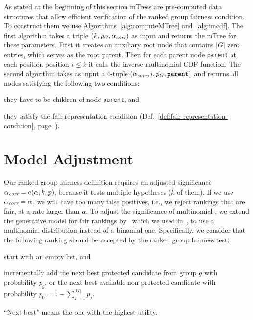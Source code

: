 

As stated at the beginning of this section mTrees are pre-computed data structures that allow efficient verification of the ranked group fairness condition.
%
To construct them we use Algorithms~\ref{alg:computeMTree} and~\ref{alg:imcdf}.
%
The first algorithm \algoComputeMTree takes a triple $(k,p_G,\alpha_\textit{corr})$ as input and returns the mTree for these parameters.
%
First it creates an auxiliary root node that contains $|G|$ zero entries, which serves as the root parent.
%
Then for each parent node \texttt{parent} at each position position $i \leq k$ it calls the inverse multinomial CDF function.
%
The second algorithm \algoImcdf takes as input a 4-tuple $(\alpha_\textit{corr}, i, p_G, \texttt{parent})$ and returns all nodes satisfying the following two conditions:
\begin{inparaenum}[(i.)]
	\item they have to be children of node \texttt{parent}, and
	\item they satisfy the fair representation condition (Def.~\ref{def:fair-representation-condition}, page~\pageref{def:fair-representation-condition}).
\end{inparaenum}

\section{Model Adjustment}
\label{sec:model-adjustment}

Our ranked group fairness definition requires an adjusted significance $\alpha_\textit{corr} = \operatorname{c}(\alpha, k, p)$, because it tests multiple hypotheses ($k$ of them).
%
If we use $\alpha_\textit{corr} = \alpha$, we will have too many false positives, i.e., we reject rankings that are fair, at a rate larger than $\alpha$.
%
To adjust the significance of multinomial \algoFAIR, we extend the generative model for fair rankings by~\citet{yang2016measuring} which we used in~\cite{zehlike2017fair}, to use a multinomial distribution instead of a binomial one.
%
Specifically, we consider that the following ranking should be accepted by the ranked group fairness test: \begin{inparaenum}[(i)]
	\item start with an empty list, and
	\item incrementally add the next best protected candidate from group $g$ with probability $p_g$, or the next best available non-protected candidate with probability $p_0 = 1-\sum_{j=1}^{|G|} p_j$.
\end{inparaenum}
%
``Next best'' means the one with the highest utility.

